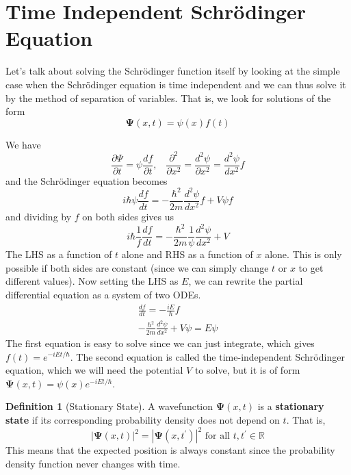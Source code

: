 \documentclass{article}
\theoremstyle{definition}
\newtheorem{definition}{Definition}[section]
\begin{document}
\section{Time Independent Schr\"odinger Equation}

  Let's talk about solving the Schr\"odinger function itself by looking at the simple case when the Schr\"odinger equation is time independent and we can thus solve it by the method of separation of variables. That is, we look for solutions of the form 
  \begin{equation} 
    \boldsymbol{\Psi}(x, t) = \psi(x) f(t)
  \end{equation}

  We have 
  \begin{equation} 
    \frac{\partial \Psi}{\partial t} = \psi \frac{d f}{\partial t} , \;\;\; \frac{\partial^2}{\partial x^2} = \frac{d^2 \psi}{\partial x^2} = \frac{d^2 \psi}{d x^2} f
  \end{equation}
  and the Schr\"odinger equation becomes 
  \begin{equation} 
    i \hbar \psi \frac{d f}{d t} = -\frac{\hbar^2}{2m}\frac{d^2 \psi}{d x^2} f + V \psi f
  \end{equation}
  and dividing by $f$ on both sides gives us 
  \begin{equation} 
    i \hbar \frac{1}{f} \frac{df}{dt} = -\frac{\hbar^2}{2m} \frac{1}{\psi} \frac{d^2 \psi}{d x^2} + V
  \end{equation}
  The LHS as a function of $t$ alone and RHS as a function of $x$ alone. This is only possible if both sides are constant (since we can simply change $t$ or $x$ to get different values). Now setting the LHS as $E$, we can rewrite the partial differential equation as a system of two ODEs. 
  \begin{align} 
    \frac{df}{dt} = - \frac{i E}{\hbar} f \\
    - \frac{\hbar^2}{2m} \frac{d^2 \psi}{dx^2} + V \psi = E \psi
  \end{align}
  The first equation is easy to solve since we can just integrate, which gives $f(t) = e^{-i E t/ \hbar}$. The second equation is called the time-independent Schr\"odinger equation, which we will need the potential $V$ to solve, but it is of form $\boldsymbol{\Psi}(x, t) = \psi(x) e^{-i E t/\hbar}$. 

  \begin{definition}[Stationary State]
    A wavefunction $\boldsymbol{\Psi}(x, t)$ is a \textbf{stationary state} if its corresponding probability density does not depend on $t$. That is, 
    \begin{equation} 
      |\boldsymbol{\Psi}(x, t)|^2 = |\boldsymbol{\Psi}(x, t^\prime)|^2  \text{ for all } t, t^\prime \in \mathbb{R}
    \end{equation}
    This means that the expected position is always constant since the probability density function never changes with time. 
  \end{definition}
\end{document}
